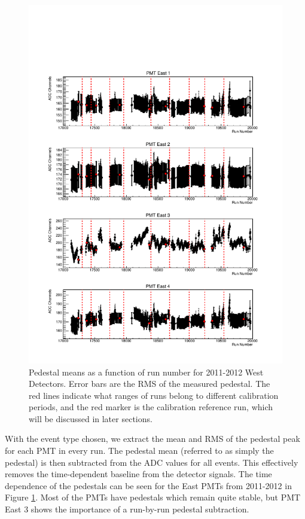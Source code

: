 \begin{figure}[p] 
\centering
\includegraphics[page=2,scale=0.8]{3-UCNAAnalysis/2011-2012_pedestals.pdf}
\caption{Pedestal means as a function of run number for 2011-2012 West Detectors. Error bars are the
  RMS of the measured pedestal. The red lines indicate what ranges of runs belong to
  different calibration periods, and the red marker is the calibration reference run,
  which will be discussed in later sections.}
\label{fig:peds_timeDep}
\end{figure}

With the event type chosen, we extract the mean and RMS of the pedestal peak
for each PMT in every run. The pedestal mean (referred to as simply
the pedestal) is then subtracted from the ADC values for all events. This effectively
removes the time-dependent baseline from the detector signals. The time dependence of
the pedestals can be seen for the East PMTs from 2011-2012 in Figure \ref{fig:peds_timeDep}.
Most of the PMTs have pedestals which remain quite stable, but PMT East 3 shows the
importance of a run-by-run pedestal subtraction.



